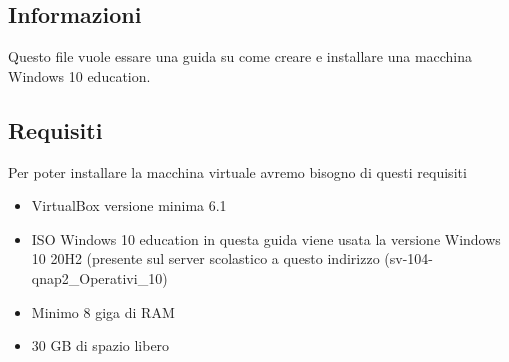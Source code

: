 \documentclass[../main.tex]{subfiles}
\begin{document}
\subsection{Informazioni}
Questo file vuole essare una guida su come creare e installare una macchina Windows  10 education.

\subsection{Requisiti}
Per poter installare la macchina virtuale avremo bisogno di questi requisiti

\begin{itemize}
    \item VirtualBox versione minima 6.1 
    \item ISO Windows  10 education in questa guida viene usata la versione Windows 10 20H2 (presente sul server scolastico a questo indirizzo (sv-104-qnap2\dati\SW\Sistemi_Operativi\Microsoft\Windows_10)
    \item Minimo 8 giga di RAM 
    \item 30 GB di spazio libero
\end{itemize}
\end{document}
